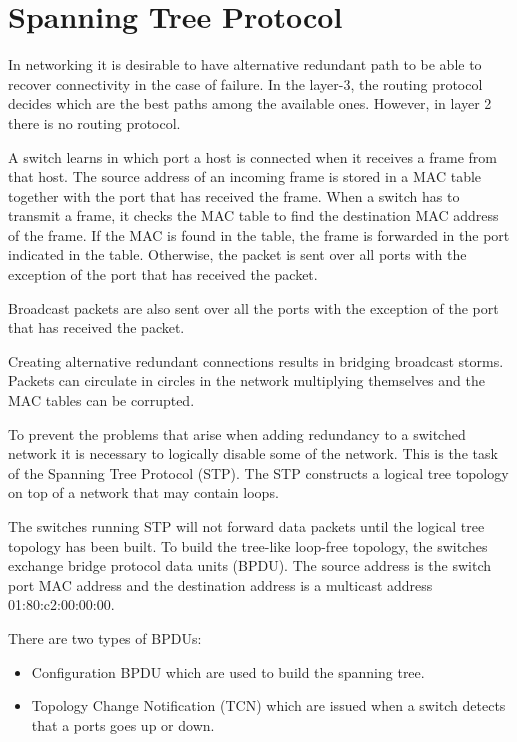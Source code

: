 \section{Spanning Tree Protocol}

In networking it is desirable to have alternative redundant path to be able to recover connectivity in the case of failure.
In the layer-3, the routing protocol decides which are the best paths among the available ones.
However, in layer 2 there is no routing protocol.

A switch learns in which port a host is connected when it receives a frame from that host.
The source address of an incoming frame is stored in a MAC table together with the port that has received the frame.
When a switch has to transmit a frame, it checks the MAC table to find the destination MAC address of the frame.
If the MAC is found in the table, the frame is forwarded in the port indicated in the table.
Otherwise, the packet is sent over all ports with the exception of the port that has received the packet.

Broadcast packets are also sent over all the ports with the exception of the port that has received the packet.

Creating alternative redundant connections results in bridging broadcast storms.
Packets can circulate in circles in the network multiplying themselves and the MAC tables can be corrupted.

To prevent the problems that arise when adding redundancy to a switched network it is necessary to logically disable some of the network.
This is the task of the Spanning Tree Protocol (STP).
The STP constructs a logical tree topology on top of a network that may contain loops.

The switches running STP will not forward data packets until the logical tree topology has been built.
To build the tree-like loop-free topology, the switches exchange bridge protocol data units (BPDU).
The source address is the switch port MAC address and the destination address is a multicast address 01:80:c2:00:00:00.

There are two types of BPDUs:
\begin{itemize}
\item Configuration BPDU which are used to build the spanning tree.
\item Topology Change Notification (TCN) which are issued when a switch detects that a ports goes up or down.
\end{itemize}


